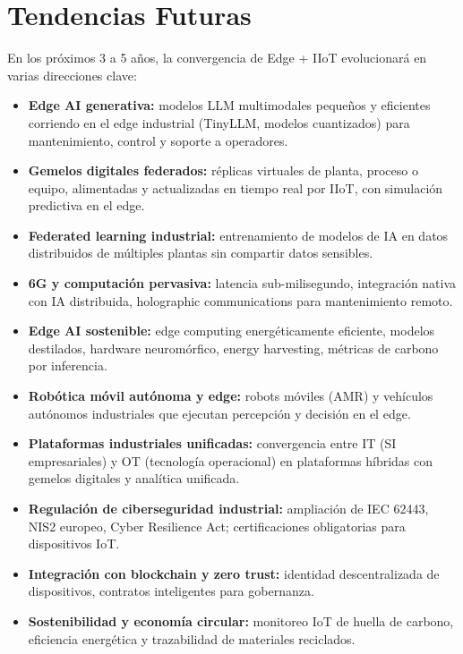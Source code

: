 ﻿\documentclass[12pt,a4paper,oneside]{article}
\begin{document}
\section{Tendencias Futuras}

En los próximos 3 a 5 años, la convergencia de Edge + IIoT evolucionará en varias direcciones clave:

\begin{itemize}[leftmargin=*]
    \item \textbf{Edge AI generativa:} modelos LLM multimodales pequeños y eficientes corriendo en el edge industrial (TinyLLM, modelos cuantizados) para mantenimiento, control y soporte a operadores.
    \item \textbf{Gemelos digitales federados:} réplicas virtuales de planta, proceso o equipo, alimentadas y actualizadas en tiempo real por IIoT, con simulación predictiva en el edge.
    \item \textbf{Federated learning industrial:} entrenamiento de modelos de IA en datos distribuidos de múltiples plantas sin compartir datos sensibles.
    \item \textbf{6G y computación pervasiva:} latencia sub-milisegundo, integración nativa con IA distribuida, holographic communications para mantenimiento remoto.
    \item \textbf{Edge AI sostenible:} edge computing energéticamente eficiente, modelos destilados, hardware neuromórfico, energy harvesting, métricas de carbono por inferencia.
    \item \textbf{Robótica móvil autónoma y edge:} robots móviles (AMR) y vehículos autónomos industriales que ejecutan percepción y decisión en el edge.
    \item \textbf{Plataformas industriales unificadas:} convergencia entre IT (SI empresariales) y OT (tecnología operacional) en plataformas híbridas con gemelos digitales y analítica unificada.
    \item \textbf{Regulación de ciberseguridad industrial:} ampliación de IEC 62443, NIS2 europeo, Cyber Resilience Act; certificaciones obligatorias para dispositivos IoT.
    \item \textbf{Integración con blockchain y zero trust:} identidad descentralizada de dispositivos, contratos inteligentes para gobernanza.
    \item \textbf{Sostenibilidad y economía circular:} monitoreo IoT de huella de carbono, eficiencia energética y trazabilidad de materiales reciclados.
\end{itemize}
\end{document}

